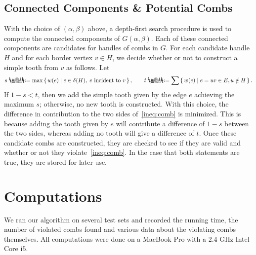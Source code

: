 \documentclass[12pt, letterpaper]{amsart}
\makeatletter
\theoremstyle{plain}
\theoremstyle{definition}
\theoremstyle{remark}
\newcommand*{\coloneqq}{\mathrel{\rlap{%
           \raisebox{0.3ex}{$\m@th\cdot$}}%
           \raisebox{-0.3ex}{$\m@th\cdot$}}%
           =}
\makeatother
\begin{document}
\subsection{Connected Components \& Potential Combs}
With the choice of $(\alpha,\beta)$ above, a depth-first search procedure is
used to compute the connected components of $G(\alpha,\beta)$. Each of these
connected components are candidates for handles of combs in $G$. For each
candidate handle $H$ and for each border vertex $v \in H$, we decide whether or
not to construct a simple tooth from $v$ as follows. Let
\begin{align*}
  s \coloneqq \max\set{w(e) | e \in \delta(H), \;\text{$e$ incident to $v$}}, \qquad t \coloneqq \sum \set{w(e) | e = uv \in E, u \notin H}.
\end{align*}
If $1 - s < t$, then we add the simple tooth given by the edge $e$ achieving
the maximum $s$; otherwise, no new tooth is constructed. With this choice, the
difference in contribution to the two sides of~\eqref{ineq:comb} is minimized.
This is because adding the tooth given by $e$ will contribute a difference of
$1 - s$ between the two sides, whereas adding no tooth will give a difference
of $t$. Once these candidate combs are constructed, they are checked to see if
they are valid and whether or not they violate~\eqref{ineq:comb}. In the case that
both statements are true, they are stored for later use.

\section{Computations}\label{sec:computations}
We ran our algorithm on several test sets and recorded the running time, the
number of violated combs found and various data about the violating combs
themselves. All computations were done on a MacBook Pro with a $2.4$ GHz Intel
Core i$5$.
\end{document}
